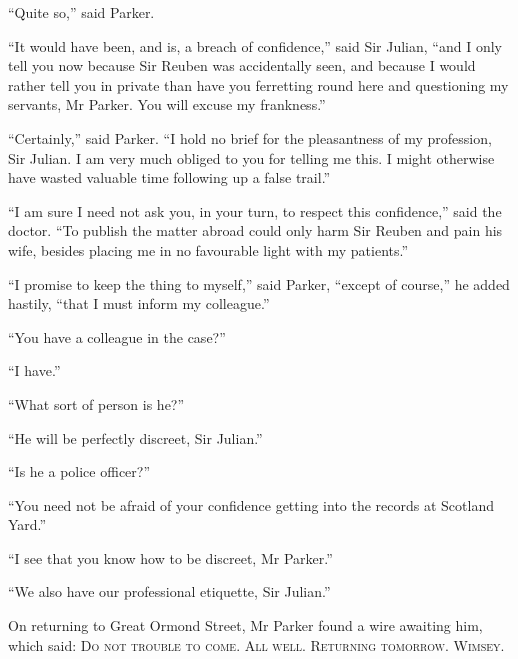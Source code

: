 \enquote{Quite so,} said Parker.

\enquote{It would have been, and is, a breach of confidence,} said Sir Julian, \enquote{and I only tell you now because Sir Reuben was accidentally seen, and because I would rather tell you in private than have you ferretting round here and questioning my servants, Mr Parker. You will excuse my frankness.}

\enquote{Certainly,} said Parker. \enquote{I hold no brief for the pleasantness of my profession, Sir Julian. I am very much obliged to you for telling me this. I might otherwise have wasted valuable time following up a false trail.}

\enquote{I am sure I need not ask you, in your turn, to respect this confidence,} said the doctor. \enquote{To publish the matter abroad could only harm Sir Reuben and pain his wife, besides placing me in no favourable light with my patients.}

\enquote{I promise to keep the thing to myself,} said Parker, \enquote{except of course,} he added hastily, \enquote{that I must inform my colleague.}

\enquote{You have a colleague in the case?}

\enquote{I have.}

\enquote{What sort of person is he?}

\enquote{He will be perfectly discreet, Sir Julian.}

\enquote{Is he a police officer?}

\enquote{You need not be afraid of your confidence getting into the records at Scotland Yard.}

\enquote{I see that you know how to be discreet, Mr Parker.}

\enquote{We also have our professional etiquette, Sir Julian.}

On returning to Great Ormond Street, Mr Parker found a wire awaiting him, which said: \textsc{Do not trouble to come. All well. Returning tomorrow. Wimsey.}